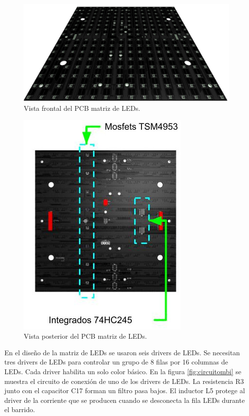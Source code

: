 \begin{figure}[htpb]
	\centering
	\includegraphics[scale=0.3]{Figures/pcbfullcolorfrontrender.jpg} 
	\caption{Vista frontal del PCB matriz de LEDs.}
	\label{fig:pcbrenderfront}
\end{figure}
\begin{figure}[htpb]
	\centering
	\includegraphics[scale=4]{Figures/pcbfullcolorbackrender.jpg} 
	\caption{Vista posterior del PCB matriz de LEDs.}
	\label{fig:pcbrenderback}
\end{figure}

En el diseño de la matriz de LEDs se usaron seis drivers de LEDs. Se necesitan tres drivers de LEDs para controlar un grupo de 8 filas por 16 columnas de LEDs. Cada driver habilita un solo color básico. En la figura \ref{fig:circuitombi} se muestra el circuito de conexión de uno de los drivers de LEDs. La resistencia R3 junto con el capacitor C17 forman un filtro pasa bajos. El inductor L5 protege al driver de la corriente que se producen cuando se desconecta la fila LEDs durante el barrido. 

